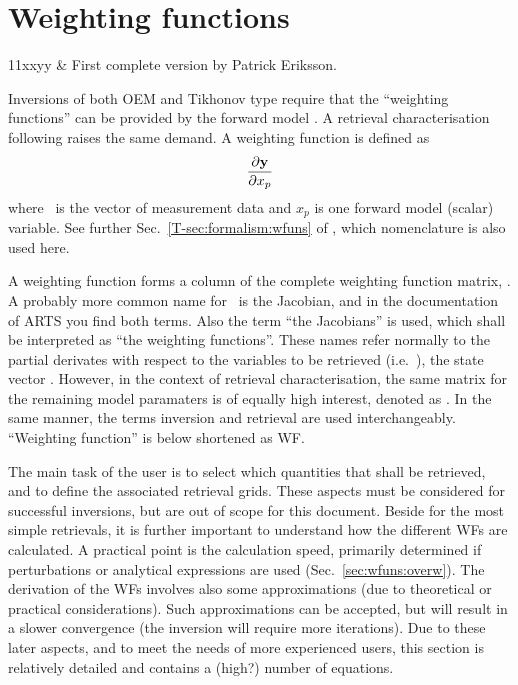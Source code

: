 \chapter{Weighting functions}
 \label{sec:wfuns}

 \starthistory
 11xxyy & First complete version by Patrick Eriksson.\\
 \stophistory

\graphicspath{{Figs/wfuns/}}


Inversions of both OEM and Tikhonov type require that the ``weighting
functions'' can be provided by the forward model \citep[see
e.g.][]{eriksson:analy:00}. A retrieval characterisation following
\citet{rodgers:90} raises the same demand. A weighting function is defined as 
\begin{equation}
  \frac{\partial \mathbf{y}}{\partial x_p}
  \label{eq:wfuns:ki}
\end{equation}
where \MsrVct\ is the vector of measurement data and $x_p$ is one forward model
(scalar) variable. See further Sec.~\ref{T-sec:formalism:wfuns} of \theory,
which nomenclature is also used here.

A weighting function forms a column of the complete weighting function matrix,
\aWfnMtr{\SttVct}. A probably more common name for \aWfnMtr{\SttVct}\ is the
Jacobian, and in the documentation of ARTS you find both terms. Also the term
``the Jacobians'' is used, which shall be interpreted as ``the weighting
functions''. These names refer normally to the partial derivates with respect
to the variables to be retrieved (i.e.\ \aWfnMtr{\SttVct}), the state vector
\SttVct. However, in the context of retrieval characterisation, the same matrix
for the remaining model paramaters is of equally high interest, denoted as
\aWfnMtr{\FrwMdlVct}. In the same manner, the terms inversion and retrieval are
used interchangeably. ``Weighting function'' is below shortened as WF.

The main task of the user is to select which quantities that shall be
retrieved, and to define the associated retrieval grids. These aspects must be
considered for successful inversions, but are out of scope for this document.
Beside for the most simple retrievals, it is further important to understand
how the different WFs are calculated. A practical point is the
calculation speed, primarily determined if perturbations or analytical
expressions are used (Sec.~\ref{sec:wfuns:overw}). The derivation of the
WFs involves also some approximations (due to theoretical or
practical considerations). Such approximations can be accepted, but
will result in a slower convergence (the inversion will require more
iterations). Due to these later aspects, and to meet the needs of more
experienced users, this section is relatively detailed and contains a (high?)
number of equations.



